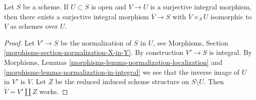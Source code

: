 \begin{lemma}
\label{lemma-extend-integral-surjective-morphisms}
Let $S$ be a scheme. If $U \subset S$ is open and $V \to U$ is a surjective
integral morphism, then there exists a surjective integral
morphism $\overline{V} \to S$ with $\overline{V} \times_S U$
isomorphic to $V$ as schemes over $U$.
\end{lemma}

\begin{proof}
Let $V' \to S$ be the normalization of $S$ in $U$, see
Morphisms, Section \ref{morphisms-section-normalization-X-in-Y}.
By construction $V' \to S$ is integral.
By Morphisms, Lemmas \ref{morphisms-lemma-normalization-localization} and
\ref{morphisms-lemma-normalization-in-integral} we see that
the inverse image of $U$ in $V'$ is $V$. Let $Z$ be the reduced
induced scheme structure on $S \setminus U$. Then
$\overline{V} = V' \amalg Z$ works.
\end{proof}
